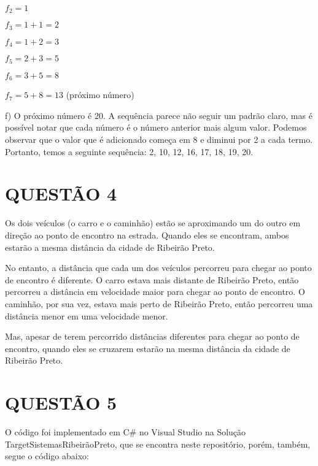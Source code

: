 \documentclass{assignment}
\begin{document}
$f_2 = 1$

$f_3 = 1 + 1 = 2$

$f_4 = 1 + 2 = 3$

$f_5 = 2 + 3 = 5$

$f_6 = 3 + 5 = 8$

$f_7 = 5 + 8 = 13$ (próximo número)
\newline

f) O próximo número é 20. A sequência parece não seguir um padrão claro, mas é possível notar que cada número é o número anterior mais algum valor. Podemos observar que o valor que é adicionado começa em 8 e diminui por 2 a cada termo. Portanto, temos a seguinte sequência: 2, 10, 12, 16, 17, 18, 19, 20.
\newline

\section*{QUESTÃO 4}

Os dois veículos (o carro e o caminhão) estão se aproximando um do outro em direção ao ponto de encontro na estrada. Quando eles se encontram, ambos estarão a mesma distância da cidade de Ribeirão Preto.

No entanto, a distância que cada um dos veículos percorreu para chegar ao ponto de encontro é diferente. O carro estava mais distante de Ribeirão Preto, então percorreu a distância em velocidade maior para chegar ao ponto de encontro. O caminhão, por sua vez, estava mais perto de Ribeirão Preto, então percorreu uma distância menor em uma velocidade menor.

Mas, apesar de terem percorrido distâncias diferentes para chegar ao ponto de encontro, quando eles se cruzarem estarão na mesma distância da cidade de Ribeirão Preto.

\section*{QUESTÃO 5}

O código foi implementado em C\# no Visual Studio na Solução TargetSistemasRibeirãoPreto, que se encontra neste repositório, porém, também, segue o código abaixo:
\\


\end{document}
